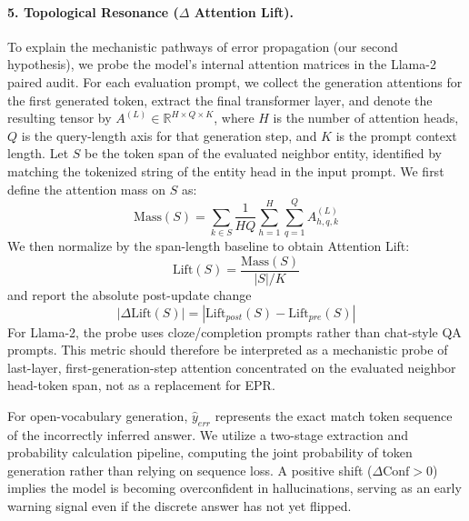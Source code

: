 \paragraph{5. Topological Resonance ($\Delta$ Attention Lift).}
To explain the mechanistic pathways of error propagation (our second hypothesis), we probe the model's internal attention matrices in the Llama-2 paired audit. For each evaluation prompt, we collect the generation attentions for the first generated token, extract the final transformer layer, and denote the resulting tensor by $A^{(L)} \in \mathbb{R}^{H \times Q \times K}$, where $H$ is the number of attention heads, $Q$ is the query-length axis for that generation step, and $K$ is the prompt context length. Let $S$ be the token span of the evaluated neighbor entity, identified by matching the tokenized string of the entity head in the input prompt. We first define the attention mass on $S$ as:
\begin{equation}
\mathrm{Mass}(S) = \sum_{k \in S} \frac{1}{HQ} \sum_{h=1}^{H} \sum_{q=1}^{Q} A^{(L)}_{h,q,k}
\end{equation}
We then normalize by the span-length baseline to obtain Attention Lift:
\begin{equation}
\mathrm{Lift}(S) = \frac{\mathrm{Mass}(S)}{|S|/K}
\end{equation}
and report the absolute post-update change
\begin{equation}
|\Delta \mathrm{Lift}(S)| = |\mathrm{Lift}_{post}(S) - \mathrm{Lift}_{pre}(S)|
\end{equation}
For Llama-2, the probe uses cloze/completion prompts rather than chat-style QA prompts. This metric should therefore be interpreted as a mechanistic probe of last-layer, first-generation-step attention concentrated on the evaluated neighbor head-token span, not as a replacement for EPR.

For open-vocabulary generation, $\hat{y}_{err}$ represents the exact match token sequence of the incorrectly inferred answer. We utilize a two-stage extraction and probability calculation pipeline, computing the joint probability of token generation rather than relying on sequence loss. A positive shift ($\Delta \text{Conf} > 0$) implies the model is becoming overconfident in hallucinations, serving as an early warning signal even if the discrete answer has not yet flipped.